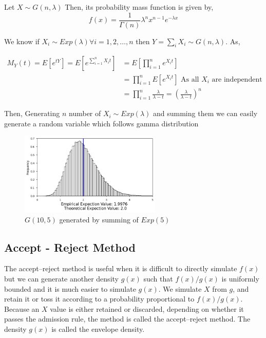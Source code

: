 \begin{example}
	Let $X\sim G(n,\lambda)$ Then, its probability  mass function is given by,
	\[
		f(x) = \frac{1}{\Gamma(n)}\lambda^{n}x^{n-1}e^{-\lambda x}
	\]

	We know if $X_i\sim Exp(\lambda) \forall i = 1,2, \ldots ,n$ then  $Y=\sum_i X_i \sim G(n,\lambda)$. As,

	\begin{align*}
		M_{Y}(t) = E \left[ e^{tY} \right] = E\left[ e^{\sum_{i=1}^{n} X_it  }\right] & = E\left[ \prod_{i=1}^{n} e^{X_it} \right]                                                \\
		                                                                              & =\prod_{i=1}^{n} E\left[  e^{X_it} \right] \text{ As all $X_i$ are independent }          \\
		                                                                              & = \prod_{i=1}^{n}\frac{\lambda}{\lambda-t} = \left( \frac{\lambda}{\lambda-t} \right)^{n}
	\end{align*}

	Then, Generating  $n$ number of $X_i\sim Exp(\lambda)$
	and summing them we can easily generate a random variable which follows gamma distribution
	\begin{figure}[H]

		\centering
		\includegraphics[width=0.6\textwidth]{images/gamma_ITA.png}
		\caption{$G(10,5)$ generated by summing of $Exp(5)$}
	\end{figure}
\end{example}

\subsection{Accept - Reject Method}
The accept–reject method is useful when it is difficult to directly simulate $f(x)$ but we can generate another density $g(x)$ such that $f(x)/g(x)$
is uniformly bounded and it is much easier to simulate $g(x)$. We simulate  $X$ from  $g$, and retain it or toss it according
to a probability proportional to $f(x)/g(x)$.
Because an $X$ value is either retained
or discarded, depending on whether it passes the admission rule, the method is called
the accept–reject method. The density $g(x)$ is called the envelope density.

